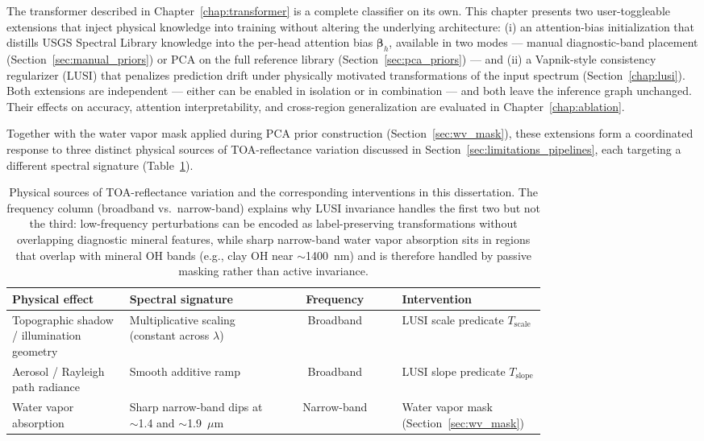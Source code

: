 \documentclass[11pt]{report}
\begin{document}
The transformer described in Chapter~\ref{chap:transformer} is a complete classifier on its own. This chapter presents two user-toggleable extensions that inject physical knowledge into training without altering the underlying architecture: (i) an attention-bias initialization that distills USGS Spectral Library knowledge into the per-head attention bias $\bm{\beta}_h$, available in two modes --- manual diagnostic-band placement (Section~\ref{sec:manual_priors}) or PCA on the full reference library (Section~\ref{sec:pca_priors}) --- and (ii) a Vapnik-style consistency regularizer (LUSI) that penalizes prediction drift under physically motivated transformations of the input spectrum (Section~\ref{chap:lusi}). Both extensions are independent --- either can be enabled in isolation or in combination --- and both leave the inference graph unchanged. Their effects on accuracy, attention interpretability, and cross-region generalization are evaluated in Chapter~\ref{chap:ablation}.

Together with the water vapor mask applied during PCA prior construction (Section~\ref{sec:wv_mask}), these extensions form a coordinated response to three distinct physical sources of TOA-reflectance variation discussed in Section~\ref{sec:limitations_pipelines}, each targeting a different spectral signature (Table~\ref{tab:phys_interventions}).
\begin{table}[htbp]
\centering
\caption{Physical sources of TOA-reflectance variation and the corresponding interventions in this dissertation. The frequency column (broadband vs.\ narrow-band) explains why LUSI invariance handles the first two but not the third: low-frequency perturbations can be encoded as label-preserving transformations without overlapping diagnostic mineral features, while sharp narrow-band water vapor absorption sits in regions that overlap with mineral OH bands (e.g., clay OH near $\sim$1400~nm) and is therefore handled by passive masking rather than active invariance.}
\label{tab:phys_interventions}
\begin{tabular}{p{0.22\linewidth} p{0.28\linewidth} c p{0.27\linewidth}}
\hline
\textbf{Physical effect} & \textbf{Spectral signature} & \textbf{Frequency} & \textbf{Intervention} \\
\hline
Topographic shadow / illumination geometry & Multiplicative scaling (constant across $\lambda$) & Broadband & LUSI scale predicate $T_{\text{scale}}$ \\
Aerosol / Rayleigh path radiance & Smooth additive ramp & Broadband & LUSI slope predicate $T_{\text{slope}}$ \\
Water vapor absorption & Sharp narrow-band dips at $\sim$1.4 and $\sim$1.9~$\mu$m & Narrow-band & Water vapor mask (Section~\ref{sec:wv_mask}) \\
\hline
\end{tabular}
\end{table}
\end{document}
